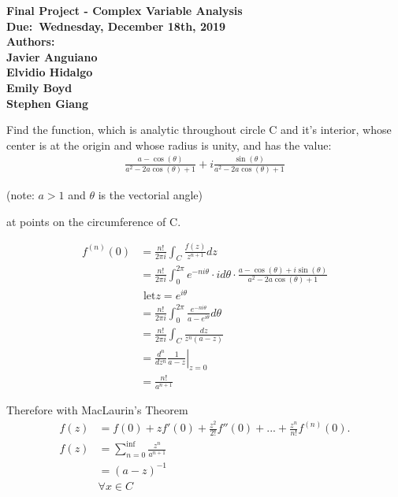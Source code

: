 \documentclass[12pt]{article}
\begin{document}
\begin{center}
	\textbf{Final Project - Complex Variable Analysis} \\
	\textbf{Due:\ Wednesday, December 18th, 2019} \\
	\textbf{Authors:}\\
	\textbf{Javier Anguiano}\\
	\textbf{Elvidio Hidalgo}\\
	\textbf{Emily Boyd}\\
	\textbf{Stephen Giang}\\
\end{center}

\medskip Find the function, which is analytic throughout circle C and it's interior, whose center is at the origin and whose radius is unity, and has the value:
\begin{align}
\frac{a - \cos (\theta)}{a^2 - 2a\cos(\theta) + 1} + i\frac{\sin (\theta)}{a^2 - 2a\cos(\theta) + 1}
\end{align}

\begin{center}
(note: $a > 1$ and $\theta$ is the vectorial angle)
\end{center}

at points on the circumference of C.

\begin{align}
f^{(n)} (0) 
&= \frac{n!}{2\pi i} \int_{C} \frac{f(z)}{z^{n+1}} dz
\\
&= \frac{n!}{2\pi i} \int_{0}^{2 \pi} e^{-n i \theta} \cdot i d \theta \cdot \frac{a - \cos( \theta ) + i \sin ( \theta)}{a^2 - 2a\cos(\theta) + 1}
\\
&\text{ let} z = e^{i \theta}
\\
&= \frac{n!}{2\pi i} \int_{0}^{2 \pi} \frac{e^{-n i \theta}}{a - e^{i \theta}} d \theta
\\
&= \frac{n!}{2\pi i} \int_{C} \frac{dz}{z^n (a-z)}
\\
&= \left.\frac{d^n}{dz^n} \frac{1}{a - z}\right|_{z = 0}
\\
&= \frac{n!}{a^{n+1}}
\end{align}

Therefore with MacLaurin's Theorem 
\begin{align}
f(z) 
&= f(0) + z f'(0) + \frac{z^2}{2!} f''(0) + ... + \frac{z^n}{n!} f^{(n)} (0).
\\
f(z) 
&= \sum_{n = 0}^{\inf} \frac{z^n}{a^{n+1}}
\\
&= (a - z)^{-1} 
\\
&\forall x \in C
\end{align}
\newpage
\end{document}
